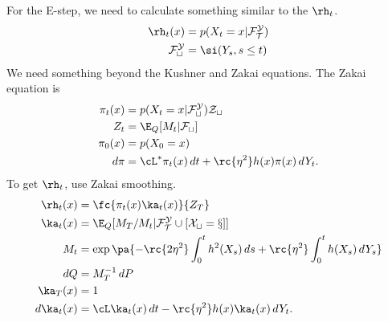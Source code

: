 For the E-step, we need to calculate something similar to the $\rh_t$.
\begin{align}
\rh_t(x) &=p(X_t=x|\cal F_T^Y)\\
\cal F_t^Y&= \si(Y_s,s\le t)
\end{align}
We need something beyond the Kushner and Zakai equations. The Zakai equation is
\begin{align}
\pi_t(x) &= p(X_t=x|\cal F_t^Y)Z_t\\
Z_t &= \E_Q[M_t|\cal F_t]\\
\pi_0(x) &=p(X_0=x)\\
d\pi&=\cL^*\pi_t(x)\,dt + \rc{\eta^2}h(x)\pi(x)\,dY_t.
\end{align}
To get $\rh_t$, use Zakai smoothing.
\begin{align}
\rh_t(x) &=\fc{\pi_t(x)\ka_t(x)}{Z_T}\\
\ka_t(x)&=\E_Q[M_T/M_t | \cal F_T^Y %
\cup [X_t=x]]\\
M_t&=\exp\pa{
-\rc{2\eta^2} \int_0^t h^2(X_s)\,ds 
+ \rc{\eta^2}\int_0^t h(X_s)\,dY_s
}\\
dQ&=M_T^{-1}\,dP\\
\ka_T(x)&=1\\
d\ka_t(x) &=\cL\ka_t(x)\,dt - \rc{\eta^2}h(x)\ka_t(x)\,dY_t.
\end{align}

